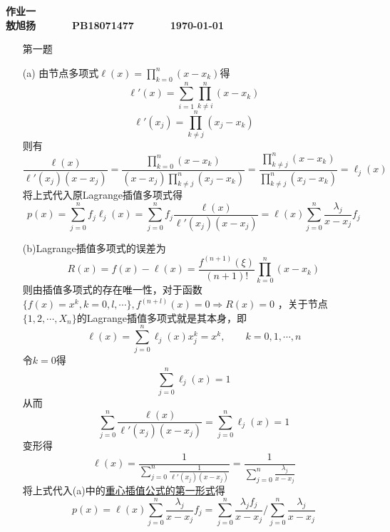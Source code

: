 \documentclass[12pt,a4paper,utf8]{ctexart}
\begin{document}


\begin{center}
\textbf{作业一}\\
\textbf{敖旭扬 ~~~~~ PB18071477 ~~~~~ \today}\\
\end{center}
\textit{}
\vspace{\baselineskip}

\begin{enumerate}
\item[第一题] 

(a) 由节点多项式$\ell(x)=\prod\limits_{k = 0}^n\left(x-x_{k}\right)$得
\begin{equation}
   \ell'(x)=\sum_{i=1}^{n}\prod_{k \neq i}^{n}\left(x-x_{k}\right) 
\end{equation}
\begin{equation}
   \ell'(x_j)=\prod_{k \neq j}^{n}\left(x_{j}-x_{k}\right) 
\end{equation}
则有
\begin{equation}
   \frac{\ell(x)}{\ell'(x_j)(x-x_j)}=\frac{\prod_{k = 0}^n(x-x_{k})}{(x-x_j)\prod_{k \neq j}^{n}(x_{j}-x_{k})}
   =\frac{\prod_{k \neq j}^n(x-x_{k})}{\prod_{k \neq j}^{n}(x_{j}-x_{k})}=\ell_j(x)
\end{equation}
将上式代入原Lagrange插值多项式得
\begin{equation}
   p(x)=\sum_{j=0}^{n}f_{j}\ell_{j}(x)=\sum_{j=0}^{n}f_{j}\frac{\ell(x)}{\ell'(x_j)(x-x_j)}
   =\ell(x)\sum_{j=0}^{n}\frac{\lambda_j}{x-x_j}f_j
\end{equation}

(b)Lagrange插值多项式的误差为
\begin{equation}
   R(x)=f(x)-\ell(x)=\frac{f^{(n+1)}(\xi)}{(n+1)!}\prod_{k=0}^{n}(x-x_k)
\end{equation}
则由插值多项式的存在唯一性，对于函数
$\{f(x) = x^k , k=0 , l,\cdots\}, f^{(n+l)}(x) =0 \Rightarrow  R(x) = 0$
，关于节点$\{1,2,\cdots ,X_n\}$的Lagrange插值多项式就是其本身，即
\begin{equation}
   \ell(x)=\sum_{j=0}^{n}\ell_j(x)x_j^k=x^k,\qquad k=0,1,\cdots,n
\end{equation}
令$k=0$得
\begin{equation}
   \sum_{j=0}^{n}\ell_j(x)=1
\end{equation}
从而
\begin{equation}
   \sum_{j=0}^{n}\frac{\ell(x)}{\ell'(x_j)(x-x_j)}=\sum_{j=0}^{n}\ell_j(x)=1
\end{equation}
变形得
\begin{equation}
   \ell(x)=\frac{1}{\sum_{j=0}^{n}\frac{1}{\ell'(x_j)(x-x_j)}}=\frac{1}{\sum_{j=0}^{n}\frac{\lambda_j}{x-x_j}}
\end{equation}
将上式代入(a)中的\underline{重心插值公式的第一形式}得
\begin{equation}
   p(x)=\ell(x)\sum_{j=0}^{n}\frac{\lambda_j}{x-x_j}f_j
   =\sum_{j=0}^{n}\frac{\lambda_j f_j}{x-x_j} \bigg/ \sum_{j=0}^{n}\frac{\lambda_j}{x-x_j}
\end{equation}


\end{enumerate}
\end{document}
